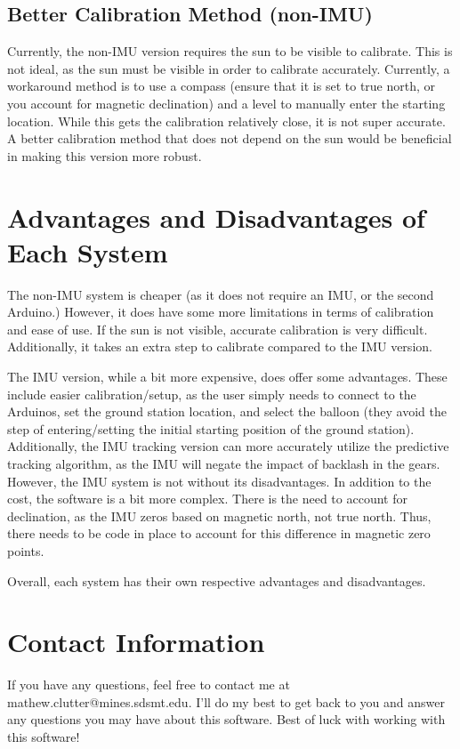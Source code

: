 \documentclass{article}
\begin{document}
\subsection{Better Calibration Method (non-IMU)}
Currently, the non-IMU version requires the sun to be visible to calibrate. This is not ideal, as the sun must be visible in order to calibrate accurately. Currently, a workaround method is to use a compass (ensure that it is set to true north, or you account for magnetic declination) and a level to manually enter the starting location. While this gets the calibration relatively close, it is not super accurate. A better calibration method that does not depend on the sun would be beneficial in making this version more robust.


\section{Advantages and Disadvantages of Each System}
The non-IMU system is cheaper (as it does not require an IMU, or the second Arduino.) However, it does have some more limitations in terms of calibration and ease of use. If the sun is not visible, accurate calibration is very difficult. Additionally, it takes an extra step to calibrate compared to the IMU version. 

The IMU version, while a bit more expensive, does offer some advantages. These include easier calibration/setup, as the user simply needs to connect to the Arduinos, set the ground station location, and select the balloon (they avoid the step of entering/setting the initial starting position of the ground station). Additionally, the IMU tracking version can more accurately utilize the predictive tracking algorithm, as the IMU will negate the impact of backlash in the gears. However, the IMU system is not without its disadvantages. In addition to the cost, the software is a bit more complex. There is the need to account for declination, as the IMU zeros based on magnetic north, not true north. Thus, there needs to be code in place to account for this difference in magnetic zero points. 

Overall, each system has their own respective advantages and disadvantages. 


\section{Contact Information}
If you have any questions, feel free to contact me at mathew.clutter@mines.sdsmt.edu. I'll do my best to get back to you and answer any questions you may have about this software. Best of luck with working with this software!
\end{document}
